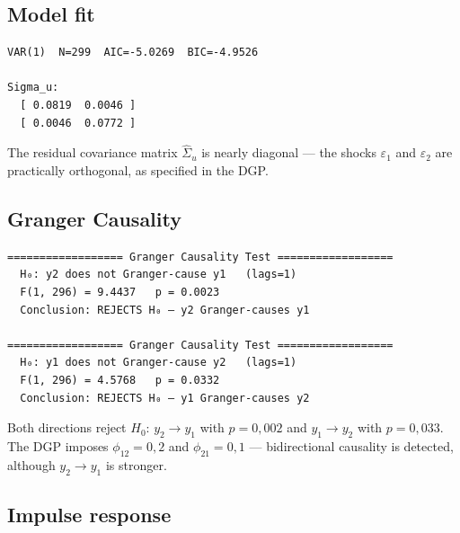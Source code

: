 \subsection*{Model fit}

\begin{lstlisting}[language={}, basicstyle=\ttfamily\small,
  frame=none, numbers=none, backgroundcolor=\color{codbg},
  xleftmargin=0pt, xrightmargin=0pt, breaklines=false]
VAR(1)  N=299  AIC=-5.0269  BIC=-4.9526

Sigma_u:
  [ 0.0819  0.0046 ]
  [ 0.0046  0.0772 ]
\end{lstlisting}

The residual covariance matrix $\hat\Sigma_u$ is nearly diagonal --- the
shocks $\varepsilon_1$ and $\varepsilon_2$ are practically orthogonal,
as specified in the DGP.

\subsection*{Granger Causality}

\begin{lstlisting}[language={}, basicstyle=\ttfamily\small,
  frame=none, numbers=none, backgroundcolor=\color{codbg},
  xleftmargin=0pt, xrightmargin=0pt, breaklines=false]
================== Granger Causality Test ==================
  H₀: y2 does not Granger-cause y1   (lags=1)
  F(1, 296) = 9.4437   p = 0.0023
  Conclusion: REJECTS H₀ — y2 Granger-causes y1

================== Granger Causality Test ==================
  H₀: y1 does not Granger-cause y2   (lags=1)
  F(1, 296) = 4.5768   p = 0.0332
  Conclusion: REJECTS H₀ — y1 Granger-causes y2
\end{lstlisting}

Both directions reject $H_0$: $y_2 \to y_1$ with $p = 0{,}002$ and
$y_1 \to y_2$ with $p = 0{,}033$. The DGP imposes $\phi_{12} = 0{,}2$ and
$\phi_{21} = 0{,}1$ --- bidirectional causality is detected, although
$y_2 \to y_1$ is stronger.

\subsection*{Impulse response}


